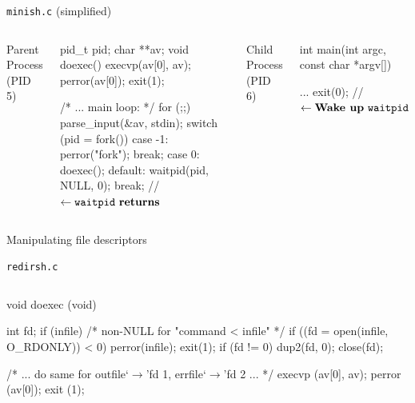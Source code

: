 \documentclass[11pt,aspectratio=169]{beamer}
\begin{document}
\begin{slide}{\texttt{minish.c} (simplified)}
\begin{columns}
Parent Process (PID 5)
\begin{smallccode}[mathescape=true,numbers=left]
pid_t pid; char **av;
void doexec() {
  execvp(av[0], av);
  perror(av[0]);
  exit(1);
}    

    /* ... main loop: */
    for (;;) {
      parse_input(&av, stdin);
      switch (pid = fork()) {
      case -1:
	perror("fork"); break;
      case 0:
	doexec();
      default:
	waitpid(pid, NULL, 0); break;
	// $\leftarrow {\tt waitpid}~{\bf returns}$
      }
    }
\end{smallccode}
Child Process (PID 6)
\begin{smallccode}[mathescape=true]

int
main(int argc, const char *argv[])
{

  ...
  exit(0); // $\leftarrow \textbf{Wake up}~{\tt waitpid}$
}
\end{smallccode}
\end{columns}
\end{slide}

\begin{slide}{Manipulating file descriptors}
\end{slide}

\begin{slide}{\texttt{redirsh.c}}
\vspace{-1em}
\begin{columns}
\begin{ccode}[numbers=left]
void doexec (void) {
  int fd;
  if (infile) {       /* non-NULL for "command < infile" */
    if ((fd = open(infile, O_RDONLY)) < 0) {
      perror(infile);
      exit(1);
    }
    if (fd != 0) {
      dup2(fd, 0);
      close(fd);
    }
  }

  /* ... do same for outfile`\color{comment}$\to$'fd 1, errfile`\color{comment}$\to$'fd 2 ... */
  execvp (av[0], av);
  perror (av[0]);
  exit (1);
}    
\end{ccode}
\end{columns}
\end{slide}
\end{document}
